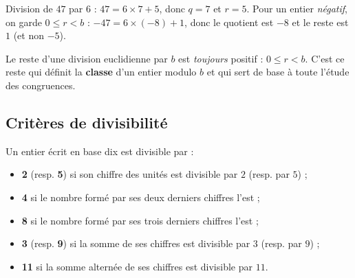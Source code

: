 \begin{illus}
\end{illus}

\begin{exemple}
Division de $47$ par $6$ : $47=6\times 7+5$, donc $q=7$ et $r=5$.
Pour un entier \emph{négatif}, on garde $0\le r<b$ : $-47=6\times(-8)+1$, donc le quotient est $-8$ et le reste est $1$ (et non $-5$).
\end{exemple}

\begin{aretenir}
Le reste d'une division euclidienne par $b$ est \emph{toujours} positif : $0\le r<b$. C'est ce reste qui définit la \textbf{classe} d'un entier modulo $b$ et qui sert de base à toute l'étude des congruences.
\end{aretenir}

\subsection{Critères de divisibilité}

\begin{propriete}
Un entier écrit en base dix est divisible par :
\begin{itemize}
\item \textbf{2} (resp. \textbf{5}) si son chiffre des unités est divisible par $2$ (resp. par $5$) ;
\item \textbf{4} si le nombre formé par ses deux derniers chiffres l'est ;
\item \textbf{8} si le nombre formé par ses trois derniers chiffres l'est ;
\item \textbf{3} (resp. \textbf{9}) si la somme de ses chiffres est divisible par $3$ (resp. par $9$) ;
\item \textbf{11} si la somme alternée de ses chiffres est divisible par $11$.
\end{itemize}
\end{propriete}


